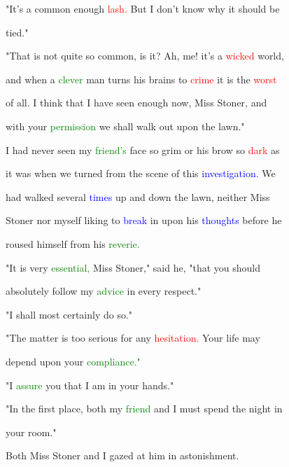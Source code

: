  "It's a common enough \textcolor{red}{lash.} But I don't know why it should be

 tied."



 "That is not quite so common, is it? Ah, me! it's a \textcolor{red}{wicked} world,

 and when a \textcolor{green}{clever} man turns his brains to \textcolor{red}{crime} it is the \textcolor{red}{worst}

 of all. I think that I have seen enough now, Miss Stoner, and

 with your \textcolor{green}{permission} we shall walk out upon the lawn."



 I had never seen my \textcolor{green}{friend's} face so \textcolor{BurntOrange}{grim} or his brow so \textcolor{red}{dark} as

 it was when we turned from the scene of this \textcolor{blue}{investigation.} We

 had walked several \textcolor{blue}{times} up and down the lawn, neither Miss

 Stoner nor myself liking to \textcolor{blue}{break} in upon his \textcolor{blue}{thoughts} before he

 roused himself from his \textcolor{green}{reverie.}



 "It is very \textcolor{green}{essential,} Miss Stoner," said he, "that you should

 absolutely follow my \textcolor{green}{advice} in every \textcolor{BurntOrange}{respect."}



 "I shall most certainly do so."



 "The matter is too serious for any \textcolor{red}{hesitation.} Your life may

 \textcolor{BurntOrange}{depend} upon your \textcolor{green}{compliance."}



 "I \textcolor{green}{assure} you that I am in your hands."



 "In the first place, both my \textcolor{green}{friend} and I must spend the night in

 your room."



 Both Miss Stoner and I gazed at him in \textcolor{BurntOrange}{astonishment.}



